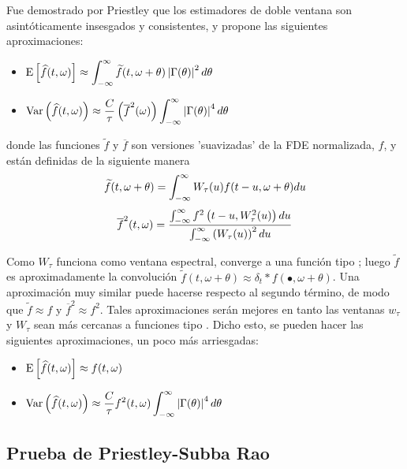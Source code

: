 Fue demostrado por Priestley \cite{Priestley65} que los estimadores de doble ventana son 
asint\'oticamente insesgados y consistentes, y propone las siguientes aproximaciones:
\begin{itemize}
\item $\displaystyle
\mathrm{E}\left[ \widehat{ f }(t,\omega) \right] \approx 
\int_{-\infty}^{\infty} \widetilde{f}(t,\omega+\theta) \left| \Gamma(\theta) \right|^{2} d\theta$
\item $\displaystyle
\mathrm{Var}\left( \widehat{ f }(t,\omega) \right) \approx \frac{C}{\tau} \left( \overline{f}^{2}(\omega) \right)
\int_{-\infty}^{\infty} \left| \Gamma(\theta) \right|^{4} d\theta $
\end{itemize}

donde las funciones $\widetilde{f}$ y $\overline{f}$ son versiones 'suavizadas' de la FDE 
normalizada, $f$, y est\'an definidas de la siguiente manera
\begin{equation*}
\widetilde{f}(t,\omega+\theta) = 
\int_{-\infty}^{\infty} W_{\tau}(u) f(t-u,\omega+\theta) du
\end{equation*}
\begin{equation*}
\overline{f}^{2} (t,\omega) =
\frac{\int_{-\infty}^{\infty} f^{2}\left(t-u,W_{\tau}^{2}(u)\right) du}
{\int_{-\infty}^{\infty} \left( W_{\tau}(u) \right)^{2} du}
\end{equation*}

Como $W_{\tau}$ funciona como ventana espectral, converge a una 
funci\'on tipo \dirac; luego $\widetilde{f}$ es aproximadamente la convoluci\'on 
$\widetilde{f}(t,\omega+\theta) \approx \delta_t \ast f(\bullet,\omega+\theta)$. 
Una aproximaci\'on muy similar 
puede hacerse respecto al segundo t\'ermino, de modo que $\widetilde{f}\approx f$ y 
$\overline{f}^{2}\approx f^{2}$.
Tales aproximaciones ser\'an mejores en tanto las ventanas $w_{\tau}$ y $W_{\tau}$ sean m\'as 
cercanas a funciones tipo \dirac.
Dicho esto, se pueden hacer las siguientes aproximaciones, un poco m\'as arriesgadas:
\begin{itemize}
\item $\displaystyle \mathrm{E}\left[ \widehat{ f }(t,\omega) \right] \approx f(t,\omega)$
\item $\displaystyle \mathrm{Var}\left( \widehat{ f }(t,\omega) \right) \approx 
\frac{C}{\tau} f^{2}(t,\omega) \int_{-\infty}^{\infty} \left| \Gamma (\theta) \right|^{4} d\theta$
\end{itemize}

\subsection{Prueba de Priestley-Subba Rao}

